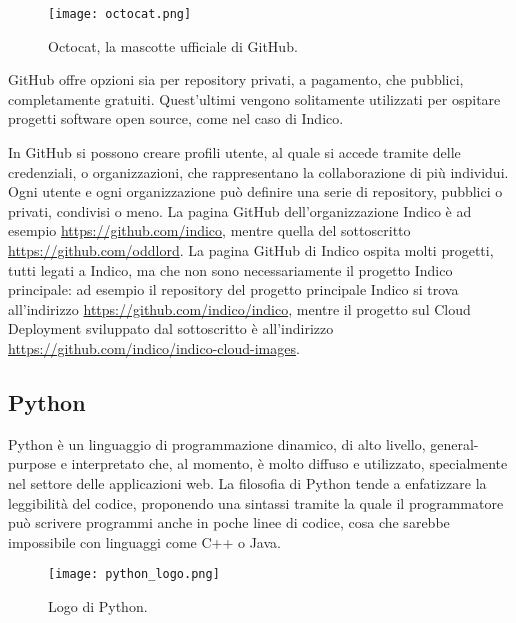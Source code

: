         	\begin{figure}[h!]
        		\begin{center}
        			\texttt{[image: octocat.png]}
        		\end{center}
        		\caption[Octocat]{Octocat, la mascotte ufficiale di GitHub.}
        		\label{fig:octocat}
        	\end{figure}
        	
        	GitHub offre opzioni sia per repository privati, a pagamento, che pubblici, completamente gratuiti. Quest'ultimi vengono solitamente utilizzati per ospitare progetti software open source, come nel caso di Indico.
        	
        	In GitHub si possono creare profili utente, al quale si accede tramite delle credenziali, o organizzazioni, che rappresentano la collaborazione di più individui. Ogni utente e ogni organizzazione può definire una serie di repository, pubblici o privati, condivisi o meno. La pagina GitHub dell'organizzazione Indico è ad esempio \url{https://github.com/indico}, mentre quella del sottoscritto \url{https://github.com/oddlord}. La pagina GitHub di Indico ospita molti progetti, tutti legati a Indico, ma che non sono necessariamente il progetto Indico principale: ad esempio il repository del progetto principale Indico si trova all'indirizzo \url{https://github.com/indico/indico}, mentre il progetto sul Cloud Deployment sviluppato dal sottoscritto è all'indirizzo \url{https://github.com/indico/indico-cloud-images}.
    
        \subsection{Python} \label{subsec:p;sl;python}
        
            Python è un linguaggio di programmazione dinamico, di alto livello, general-purpose e interpretato che, al momento, è molto diffuso e utilizzato, specialmente nel settore delle applicazioni web. La filosofia di Python tende a enfatizzare la leggibilità del codice, proponendo una sintassi tramite la quale il programmatore può scrivere programmi anche in poche linee di codice, cosa che sarebbe impossibile con linguaggi come C++ o Java. \cite{wiki:python}
        
        	\begin{figure}[h!]
        		\begin{center}
        			\texttt{[image: python\_logo.png]}
        		\end{center}
        		\caption[Logo di Python]{Logo di Python.}
        		\label{fig:python_logo}
        	\end{figure}
        	
